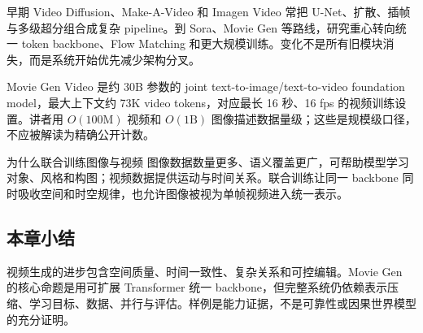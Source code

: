 早期 Video Diffusion、Make-A-Video 和 Imagen Video 常把 U-Net、扩散、插帧与多级超分组合成复杂 pipeline。到 Sora、Movie Gen 等路线，研究重心转向统一 token backbone、Flow Matching 和更大规模训练。变化不是所有旧模块消失，而是系统开始优先减少架构分叉。


Movie Gen Video 是约 30B 参数的 joint text-to-image/text-to-video foundation model，最大上下文约 73K video tokens，对应最长 16 秒、16 fps 的视频训练设置。讲者用 $O(100\mathrm{M})$ 视频和 $O(1\mathrm{B})$ 图像描述数据量级；这些是规模级口径，不应被解读为精确公开计数。

\begin{knowledgebox}{为什么联合训练图像与视频}
图像数据数量更多、语义覆盖更广，可帮助模型学习对象、风格和构图；视频数据提供运动与时间关系。联合训练让同一 backbone 同时吸收空间和时空规律，也允许图像被视为单帧视频进入统一表示。
\end{knowledgebox}


\subsection{本章小结}

视频生成的进步包含空间质量、时间一致性、复杂关系和可控编辑。Movie Gen 的核心命题是用可扩展 Transformer 统一 backbone，但完整系统仍依赖表示压缩、学习目标、数据、并行与评估。样例是能力证据，不是可靠性或因果世界模型的充分证明。

